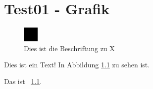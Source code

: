 \chapter{Test01 - Grafik}


\begin{figure}
\includegraphics[width=\maxwidth]{x}
\caption[Dies ist die Beschriftung zu X]{Dies ist die Beschriftung zu X}
\label{seq:refIllustration0}
\end{figure}
Dies ist ein Text! In Abbildung \ref{seq:refIllustration0} zu sehen ist.


Das ist \figurename~\ref{seq:refIllustration0}.
\endinput
